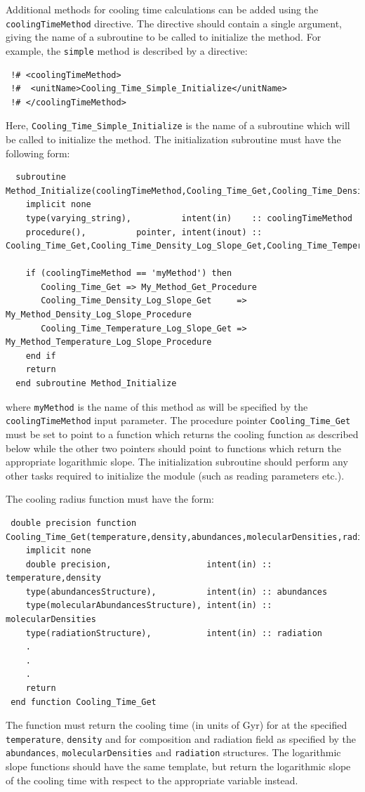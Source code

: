 Additional methods for cooling time calculations can be added using the {\tt coolingTimeMethod} directive. The directive should contain a single argument, giving the name of a subroutine to be called to initialize the method. For example, the {\tt simple} method is described by a directive:
\begin{verbatim}
 !# <coolingTimeMethod>
 !#  <unitName>Cooling_Time_Simple_Initialize</unitName>
 !# </coolingTimeMethod>
\end{verbatim}
Here, {\tt Cooling\_Time\_Simple\_Initialize} is the name of a subroutine which will be called to initialize the method. The initialization subroutine must have the following form:
\begin{verbatim}
  subroutine Method_Initialize(coolingTimeMethod,Cooling_Time_Get,Cooling_Time_Density_Log_Slope_Get,Cooling_Time_Temperature_Log_Slope_Get)
    implicit none
    type(varying_string),          intent(in)    :: coolingTimeMethod
    procedure(),          pointer, intent(inout) :: Cooling_Time_Get,Cooling_Time_Density_Log_Slope_Get,Cooling_Time_Temperature_Log_Slope_Get
    
    if (coolingTimeMethod == 'myMethod') then
       Cooling_Time_Get => My_Method_Get_Procedure
       Cooling_Time_Density_Log_Slope_Get     => My_Method_Density_Log_Slope_Procedure
       Cooling_Time_Temperature_Log_Slope_Get => My_Method_Temperature_Log_Slope_Procedure
    end if
    return
  end subroutine Method_Initialize
\end{verbatim}
where {\tt myMethod} is the name of this method as will be specified by the {\tt coolingTimeMethod} input parameter. The procedure pointer {\tt Cooling\_Time\_Get} must be set to point to a function which returns the cooling function as described below while the other two pointers should point to functions which return the appropriate logarithmic slope. The initialization subroutine should perform any other tasks required to initialize the module (such as reading parameters etc.).

The cooling radius function must have the form:
\begin{verbatim}
 double precision function Cooling_Time_Get(temperature,density,abundances,molecularDensities,radiation)
    implicit none
    double precision,                   intent(in) :: temperature,density
    type(abundancesStructure),          intent(in) :: abundances
    type(molecularAbundancesStructure), intent(in) :: molecularDensities
    type(radiationStructure),           intent(in) :: radiation
    .
    .
    .
    return
 end function Cooling_Time_Get
\end{verbatim}
The function must return the cooling time (in units of Gyr) for at the specified {\tt temperature}, {\tt density} and for composition and radiation field as specified by the {\tt abundances}, {\tt molecularDensities} and {\tt radiation} structures. The logarithmic slope functions should have the same template, but return the logarithmic slope of the cooling time with respect to the appropriate variable instead.

